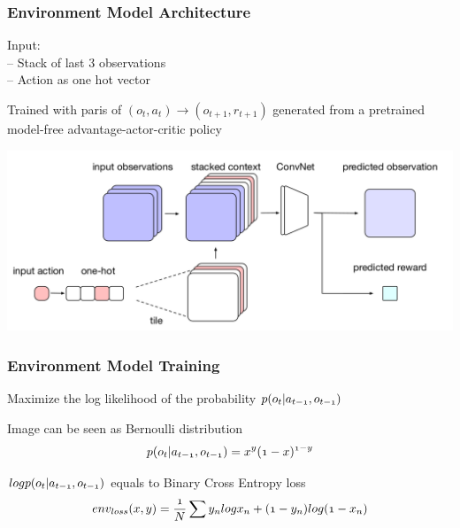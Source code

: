 \begin{frame}
    \frametitle{Environment Model Architecture}

\begin{multicols}{2}
	\begin{PraesentationAufzaehlung}
		\item Input:\\
		-- Stack of last 3 observations\\
		-- Action as one hot vector\\
		\item Trained with paris of $(o_t, a_t) \rightarrow (o_{t+1}, r_{t+1})$ generated from a pretrained model-free advantage-actor-critic policy
	\end{PraesentationAufzaehlung}
    \vfill\columnbreak
	\begin{center}
    \includegraphics[width=\columnwidth]{./Images/environment_model_architecture.png}%
	\end{center}
\end{multicols}
    
\end{frame}
\clearpage




\begin{frame}
    \frametitle{Environment Model Training}

\begin{PraesentationAufzaehlung}
	\item Maximize the log likelihood of the probability $\mathnormal{p(o_t | a_{t-1}, o_{t-1})}$
	\item Image can be seen as Bernoulli distribution
	\begin{equation}
	\mathnormal{ p(o_t | a_{t-1}, o_{t-1}) = x^y (1-x)^{1-y}
	}
	\end{equation}
	\item  $\mathnormal{log p(o_t | a_{t-1}, o_{t-1})}$ equals to Binary Cross Entropy loss
	\begin{equation}
	\mathnormal{
	env_{loss}(x, y) = \frac{1}{N} \sum y_n log x_n + (1-y_n) log(1- x_n)
	}
	\end{equation}
\end{PraesentationAufzaehlung}
    
\end{frame}
\clearpage



